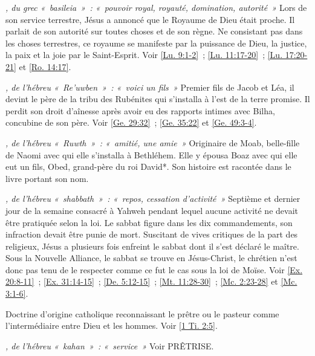 \begin{multicols}{2}
\textit{, du grec «~basileia~»~: «~pouvoir royal, royauté, domination, autorité~»}\newline
Lors de son service terrestre, Jésus a annoncé que le Royaume de Dieu était proche. Il parlait de son autorité sur toutes choses et de son règne. Ne consistant pas dans les choses terrestres, ce royaume se manifeste par la puissance de Dieu, la justice, la paix et la joie par le Saint-Esprit. Voir \vref{Lu. 9:1-2}~; \vref{Lu. 11:17-20}~; \vref{Lu. 17:20-21} et \vref{Ro. 14:17}.

\textit{, de l'hébreu «~Re'uwben~»~: «~voici un fils~»}\newline
Premier fils de Jacob et Léa, il devint le père de la tribu des Rubénites qui s'installa à l'est de la terre promise. Il perdit son droit d'aînesse après avoir eu des rapports intimes avec Bilha, concubine de son père. Voir \vref{Ge. 29:32}~; \vref{Ge. 35:22} et \vref{Ge. 49:3-4}.

\textit{, de l'hébreu «~Ruwth~»~: «~amitié, une amie~»}\newline
Originaire de Moab, belle-fille de Naomi avec qui elle s'installa à Bethléhem. Elle y épousa Boaz avec qui elle eut un fils, Obed, grand-père du roi David*. Son histoire est racontée dans le livre portant son nom.

\textit{, de l'hébreu «~shabbath~»~: «~repos, cessation d'activité~»}\newline
Septième et dernier jour de la semaine consacré à Yahweh pendant lequel aucune activité ne devait être pratiquée selon la loi. Le sabbat figure dans les dix commandements, son infraction devait être punie de mort. Suscitant de vives critiques de la part des religieux, Jésus a plusieurs fois enfreint le sabbat dont il s'est déclaré le maître. Sous la Nouvelle Alliance, le sabbat se trouve en Jésus-Christ, le chrétien n'est donc pas tenu de le respecter comme ce fut le cas sous la loi de Moïse. Voir \vref{Ex. 20:8-11}~; \vref{Ex. 31:14-15}~; \vref{De. 5:12-15}~; \vref{Mt. 11:28-30}~; \vref{Mc. 2:23-28} et \vref{Mc. 3:1-6}.

\textit{}\newline
Doctrine d'origine catholique reconnaissant le prêtre ou le pasteur comme l'intermédiaire entre Dieu et les hommes. Voir \vref{1 Ti. 2:5}.

\textit{, de l'hébreu «~kahan~»~: «~service~»}\newline
Voir PRÊTRISE.


\end{multicols}
